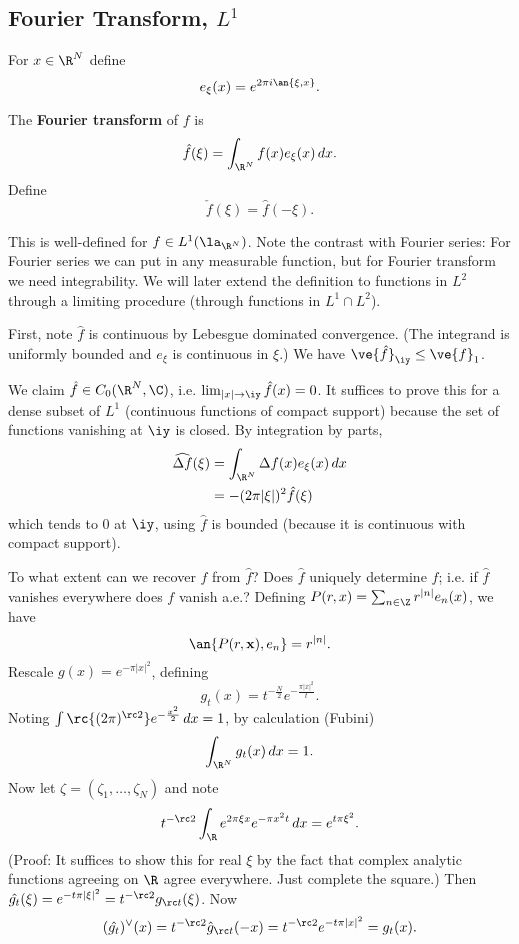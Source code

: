 
\subsection{Fourier Transform, $L^1$}
For $x\in \R^N$ define
\[
e_{\xi}(x)=e^{2\pi i \an{\xi,x}}.
\]

\begin{df}
The \textbf{Fourier transform} of $f$ is
\[
\hat{f}(\xi)=\int_{\R^N} f(x)e_{\xi}(x)\,dx.
\]
Define
\[
\check{f}(\xi)=\hat{f}(-\xi).
\]
\end{df}
This is well-defined for $f\in L^1(\la_{\R^N})$. %
Note the contrast with Fourier series: For Fourier series we can put in any measurable function, but for Fourier transform we need integrability. We will later extend the definition to functions in $L^2$ through a limiting procedure (through functions in $L^1\cap L^2$).

First, note $\hat{f}$ is continuous by Lebesgue dominated convergence. (The integrand is uniformly bounded and $e_{\xi}$ is continuous in $\xi$.)
We have $\ve{\hat f}_{\iy}\le \ve{f}_1$. 

We claim $\hat f\in C_0(\R^N,\C)$, i.e. $\lim_{|x|\to \iy} \hat{f}(x)=0$. It suffices to prove this for a dense subset of $L^1$ (continuous functions of compact support) because the set of functions vanishing at $\iy$ is closed.
By integration by parts,
\begin{align*}
\widehat{\Delta f}(\xi)&=\int_{\R^N} \Delta f(x)e_{\xi}(x)\,dx\\
&=-(2\pi|\xi|)^2\hat{f}(\xi)
\end{align*}
which tends to 0 at $\iy$, using $\hat{f}$ is bounded (because it is continuous with compact support).

To what extent can we recover $f$ from $\hat{f}$? Does $\hat{f}$ uniquely determine $f$; i.e. if $\hat{f}$ vanishes everywhere does $f$ vanish a.e.? Defining $P(r,x)=\sum_{n\in \Z} r^{|n|} e_n(x)$, we have
\[
\an{P(r,\mathbf{x}),e_n}=r^{|n|}.
\]
Rescale $g(x)=e^{-\pi |x|^2}$, defining
\[
g_t(x)=t^{-\frac{N}{2}}e^{-\frac{\pi|x|^2}{t}}.
\]
Noting $\int \rc{(2\pi)^{\rc 2}} e^{-\frac{x^2}{2}}\,dx=1$, by calculation (Fubini)
\[
\int_{\R^N} g_t(x)\,dx=1.
\]
Now let $\zeta=(\zeta_1,\ldots,\zeta_N)$ and note
\[
t^{-\rc 2} \int_{\R} e^{2\pi \xi x}e^{-{\pi}{x^2}{t}}\,dx=e^{t\pi \xi^2}.
\]
(Proof: It suffices to show this for real $\xi$ by the fact that complex analytic functions agreeing on $\R$ agree everywhere. Just complete the square.) %
Then $\hat{g_t}(\xi)=e^{-t\pi |\xi|^2}=t^{-\rc 2}g_{\rc t}(\xi)$. Now
\[
(\hat{g_t})^{\vee}(x)=t^{-\rc 2}\hat{g}_{\rc t}(-x)=t^{-\rc 2}e^{-t\pi |x|^2}=g_t(x).
\]

